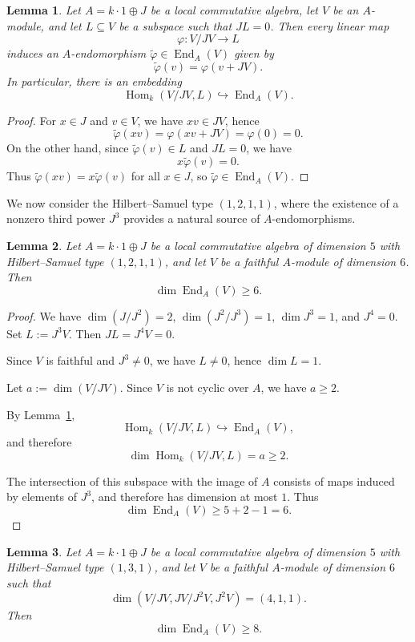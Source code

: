 \documentclass[11pt]{article}
\DeclareMathOperator{\End}{End}
\DeclareMathOperator{\Hom}{Hom}
\theoremstyle{plain}
\newtheorem{lemma}{Lemma}
\theoremstyle{remark}
\begin{document}
\begin{lemma}\label{lem:homtool}
	Let $A = k \cdot 1 \oplus J$ be a local commutative algebra, let $V$ be an $A$-module, and let
	$L \subseteq V$ be a subspace such that $JL = 0$. Then every linear map
	\[
	\varphi : V/JV \to L
	\]
	induces an $A$-endomorphism $\widetilde{\varphi} \in \End_A(V)$ given by
	\[
	\widetilde{\varphi}(v) = \varphi(v + JV).
	\]
	In particular, there is an embedding
	\[
	\Hom_k(V/JV, L) \hookrightarrow \End_A(V).
	\]
\end{lemma}

\begin{proof}
	For $x \in J$ and $v \in V$, we have $xv \in JV$, hence
	\[
	\widetilde{\varphi}(xv) = \varphi(xv + JV) = \varphi(0) = 0.
	\]
	On the other hand, since $\widetilde{\varphi}(v) \in L$ and $JL = 0$, we have
	\[
	x \widetilde{\varphi}(v) = 0.
	\]
	Thus $\widetilde{\varphi}(xv) = x \widetilde{\varphi}(v)$ for all $x\in J$, so
	$\widetilde{\varphi} \in \End_A(V)$.
\end{proof}

We now consider the Hilbert--Samuel type $(1,2,1,1)$, where the existence of a nonzero third power
$J^3$ provides a natural source of $A$-endomorphisms.

\begin{lemma}
	Let $A = k \cdot 1 \oplus J$ be a local commutative algebra of dimension $5$ with Hilbert--Samuel type
	$(1,2,1,1)$, and let $V$ be a faithful $A$-module of dimension $6$. Then
	\[
	\dim \End_A(V) \ge 6.
	\]
\end{lemma}

\begin{proof}
	We have $\dim(J/J^2)=2$, $\dim(J^2/J^3)=1$, $\dim J^3 = 1$, and $J^4=0$. Set $L := J^3V$. Then
	$JL = J^4V = 0$.
	
	Since $V$ is faithful and $J^3 \neq 0$, we have $L \neq 0$, hence $\dim L = 1$.
	
	Let $a := \dim(V/JV)$. Since $V$ is not cyclic over $A$, we have $a \ge 2$.
	
	By Lemma~\ref{lem:homtool},
	\[
	\Hom_k(V/JV, L) \hookrightarrow \End_A(V),
	\]
	and therefore
	\[
	\dim \Hom_k(V/JV, L) = a \ge 2.
	\]
	
	The intersection of this subspace with the image of $A$ consists of maps induced by elements of $J^3$,
	and therefore has dimension at most $1$. Thus
	\[
	\dim \End_A(V) \ge 5 + 2 - 1 = 6.
	\]
\end{proof}

\begin{lemma}
	Let $A = k \cdot 1 \oplus J$ be a local commutative algebra of dimension $5$ with Hilbert--Samuel type
	$(1,3,1)$, and let $V$ be a faithful $A$-module of dimension $6$ such that
	\[
	\dim(V/JV, JV/J^2V, J^2V) = (4,1,1).
	\]
	Then
	\[
	\dim \End_A(V) \ge 8.
	\]
\end{lemma}
\end{document}
